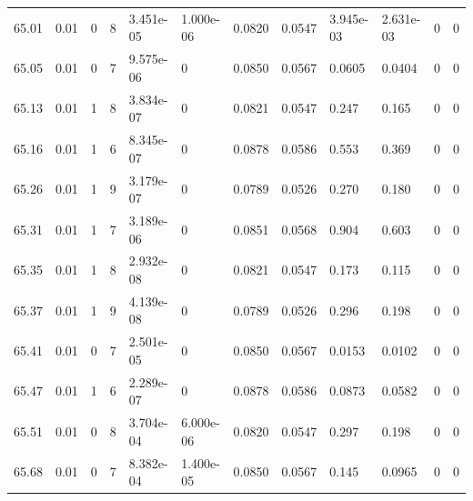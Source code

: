 \documentclass[preview]{standalone}
\begin{document}
{{{{{{{{{{{{{{{{{\begin{tabular}{L{1.2cm}C{1.2cm} C{0.3cm}C{0.5cm} C{1.4cm}C{1.4cm} C{1.4cm}C{1.4cm} C{1.6cm}C{1.6cm} C{1.6cm}C{1.6cm}}
  65.01  &  0.01  & 0     &  8 &  3.451e-05  & 1.000e-06  &  0.0820&   0.0547& 3.945e-03 & 2.631e-03   &  0 & 0  \\ 
  65.05  &  0.01  & 0     &  7 &  9.575e-06  & 0  &  0.0850&   0.0567& 0.0605 & 0.0404   &  0 & 0  \\ 
  65.13  &  0.01  & 1     &  8 &  3.834e-07  & 0  &  0.0821&   0.0547& 0.247 & 0.165   &  0 & 0  \\ 
  65.16  &  0.01  & 1     &  6 &  8.345e-07  & 0  &  0.0878&   0.0586& 0.553 & 0.369   &  0 & 0  \\ 
  65.26  &  0.01  & 1     &  9 &  3.179e-07  & 0  &  0.0789&   0.0526& 0.270 & 0.180   &  0 & 0  \\ 
  65.31  &  0.01  & 1     &  7 &  3.189e-06  & 0  &  0.0851&   0.0568& 0.904 & 0.603   &  0 & 0  \\ 
  65.35  &  0.01  & 1     &  8 &  2.932e-08  & 0  &  0.0821&   0.0547& 0.173 & 0.115   &  0 & 0  \\ 
  65.37  &  0.01  & 1     &  9 &  4.139e-08  & 0  &  0.0789&   0.0526& 0.296 & 0.198   &  0 & 0  \\ 
  65.41  &  0.01  & 0     &  7 &  2.501e-05  & 0  &  0.0850&   0.0567& 0.0153 & 0.0102   &  0 & 0  \\ 
  65.47  &  0.01  & 1     &  6 &  2.289e-07  & 0  &  0.0878&   0.0586& 0.0873 & 0.0582   &  0 & 0  \\ 
  65.51  &  0.01  & 0     &  8 &  3.704e-04  & 6.000e-06  &  0.0820&   0.0547& 0.297 & 0.198   &  0 & 0  \\ 
  65.68  &  0.01  & 0     &  7 &  8.382e-04  & 1.400e-05  &  0.0850&   0.0567& 0.145 & 0.0965   &  0 & 0  \\ 
\hline 
\end{tabular} 

}}}}}}}}}}}}}}}}}
\end{document}
